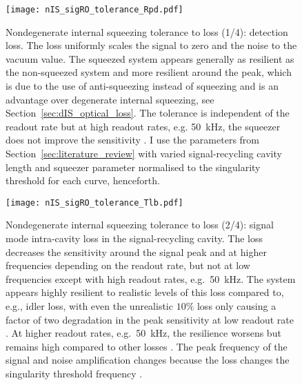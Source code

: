 \begin{figure}
    \centering
    \texttt{[image: nIS\_sigRO\_tolerance\_Rpd.pdf]}
    \caption{  Nondegenerate internal squeezing tolerance to loss (1/4): detection loss. The loss uniformly scales the signal to zero and the noise to the vacuum value. The squeezed system appears generally as resilient as the non-squeezed system and more resilient around the peak, which is due to the use of anti-squeezing instead of squeezing and is an advantage over degenerate internal squeezing, see Section~\ref{sec:dIS_optical_loss}. The tolerance is independent of the readout rate but at high readout rates, e.g. 50~kHz, the squeezer does not improve the sensitivity . I use the parameters from Section~\ref{sec:literature_review} with varied signal-recycling cavity length  and squeezer parameter normalised to the singularity threshold for each curve, henceforth.}
    \label{fig:nIS_sigRO_tolerance_Rpd}
\end{figure}
\begin{figure}
    \centering
    \texttt{[image: nIS\_sigRO\_tolerance\_Tlb.pdf]}
    \caption{  Nondegenerate internal squeezing tolerance to loss (2/4): signal mode intra-cavity loss in the signal-recycling cavity. The loss decreases the sensitivity around the signal peak and at higher frequencies depending on the readout rate, but not at low frequencies except with high readout rates, e.g.\ 50~kHz. The system appears highly resilient to realistic levels of this loss compared to, e.g., idler loss, with even the unrealistic $10\%$ loss only causing a factor of two degradation in the peak sensitivity at low readout rate . At higher readout rates, e.g.\ 50~kHz, the resilience worsens but remains high compared to other losses . The peak frequency of the signal and noise amplification changes because the loss changes the singularity threshold frequency .}
    \label{fig:nIS_sigRO_tolerance_Tlb}
\end{figure}
